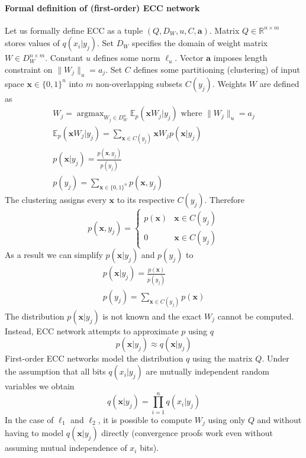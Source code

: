\documentclass[12pt]{article}
\DeclareMathOperator*{\argmax}{argmax}
\begin{document}
\paragraph{Formal definition of (first-order) ECC network}
Let us formally define ECC as a tuple $(Q,D_W,u,C,\boldsymbol{a})$. Matrix $Q\in \mathbb{R}^{n\times m}$ stores values of $q(x_i|y_j)$. Set $D_W$ specifies the domain of weight matrix $W\in D_W^{n \times m}$. Constant $u$ defines some norm $\ell_u$.  Vector $\boldsymbol{a}$ imposes length constraint on $\lVert W_j \rVert_u=a_j$. Set $C$ defines some partitioning (clustering) of input space $\boldsymbol{x}\in \{0,1\}^n$ into $m$ non-overlapping subsets $C(y_j) $.
Weights $W$ are defined as
\begin{gather*}
	W_j = \argmax_{W_j\in D_W^{n}} \mathbb{E}_p(\boldsymbol{x}W_j|y_j)\text{ where } \lVert W_j \rVert_u=a_j \\
	\mathbb{E}_p(\boldsymbol{x}W_j|y_j) = \sum_{\boldsymbol{x}\in C(y_j)}\boldsymbol{x}W_jp(\boldsymbol{x}|y_j) \\ 
	p(\boldsymbol{x}|y_j) = \frac{p(\boldsymbol{x},y_j)}{p(y_j)} \\
	p(y_j) =  \sum_{\boldsymbol{x}\in \{0,1\}^n}p(\boldsymbol{x},y_j)
\end{gather*}
The clustering assigns every $\boldsymbol{x}$ to its respective $C(y_j)$. Therefore 
\[
p(\boldsymbol{x},y_j) = \begin{cases}
	p(\boldsymbol{x}) & \boldsymbol{x} \in C(y_j) \\
	0 & \boldsymbol{x} \in C(y_j)
\end{cases}
\]
As a result we can simplify $p(\boldsymbol{x}|y_j)$ and $p(y_j)$ to
\begin{gather*}
p(\boldsymbol{x}|y_j) = \frac{p(\boldsymbol{x})}{p(y_j)} \\
p(y_j) =  \sum_{\boldsymbol{x}\in C(y_j)}p(\boldsymbol{x})
\end{gather*}
The distribution $p(\boldsymbol{x}|y_j)$ is not known and the exact $W_j$ cannot be computed. Instead, ECC network attempts to approximate $p$ using $q$ 
\[
p(\boldsymbol{x}|y_j) \approx q(\boldsymbol{x}|y_j)
\]
First-order ECC networks model the distribution $q$ using the matrix $Q$. 
Under the assumption that all bits $q(x_i|y_j)$ are mutually independent random variables we obtain
\[
q(\boldsymbol{x}|y_j) = \prod_{i=1}^n q(x_i|y_j)
\]
In the case of $\ell_1$ and $\ell_2$, it is possible to compute $W_j$ using only  $Q$ and without having to model $q(\boldsymbol{x}|y_j)$ directly (convergence proofs work even without assuming mutual independence of $x_i$ bits).
\end{document}
